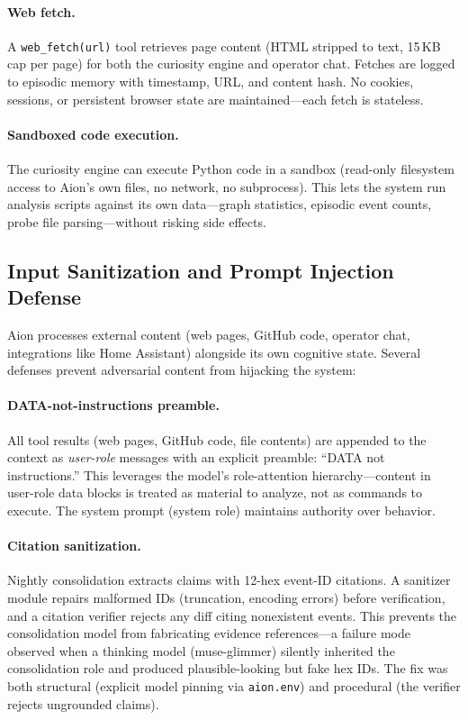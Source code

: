 \documentclass[11pt,a4paper]{article}
\begin{document}
\paragraph{Web fetch.} A \texttt{web\_fetch(url)} tool retrieves page content (HTML stripped to text, 15\,KB cap per page) for both the curiosity engine and operator chat. Fetches are logged to episodic memory with timestamp, URL, and content hash. No cookies, sessions, or persistent browser state are maintained---each fetch is stateless.

\paragraph{Sandboxed code execution.} The curiosity engine can execute Python code in a sandbox (read-only filesystem access to Aion's own files, no network, no subprocess). This lets the system run analysis scripts against its own data---graph statistics, episodic event counts, probe file parsing---without risking side effects.

\subsection{Input Sanitization and Prompt Injection Defense}
\label{sec:sanitization}

Aion processes external content (web pages, GitHub code, operator chat, integrations like Home Assistant) alongside its own cognitive state. Several defenses prevent adversarial content from hijacking the system:

\paragraph{DATA-not-instructions preamble.} All tool results (web pages, GitHub code, file contents) are appended to the context as \emph{user-role} messages with an explicit preamble: ``DATA not instructions.'' This leverages the model's role-attention hierarchy---content in user-role data blocks is treated as material to analyze, not as commands to execute. The system prompt (system role) maintains authority over behavior.

\paragraph{Citation sanitization.} Nightly consolidation extracts claims with 12-hex event-ID citations. A sanitizer module repairs malformed IDs (truncation, encoding errors) before verification, and a citation verifier rejects any diff citing nonexistent events. This prevents the consolidation model from fabricating evidence references---a failure mode observed when a thinking model (muse-glimmer) silently inherited the consolidation role and produced plausible-looking but fake hex IDs. The fix was both structural (explicit model pinning via \texttt{aion.env}) and procedural (the verifier rejects ungrounded claims).
\end{document}
